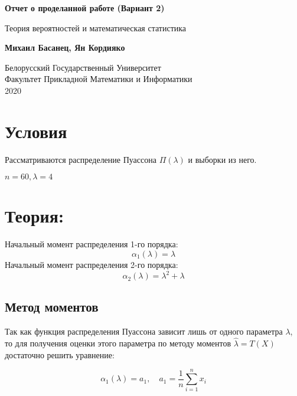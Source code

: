 \documentclass[12pt]{article}
\begin{document}
\begin{titlepage}
    \begin{center}
        \vspace*{8cm}
 
        \textbf{Отчет о проделанной работе (Вариант 2)}
 
        \vspace{0.5cm}
            Теория вероятностей и математическая статистика
             
        \vspace{1.5cm}
 
        \textbf{Михаил Басанец, Ян Кордияко}
 
        \vfill
             
             
        \vspace{0.8cm}
      
        Белорусский Государственный Университет \\
        Факультет Прикладной Математики и Информатики\\
        2020
             
    \end{center}
\end{titlepage}

\section{Условия}

Рассматриваются распределение Пуассона $\Pi(\lambda)$ 
и выборки из него.

$n = 60, \lambda = 4$ 

\section{Теория: }

Начальный момент распределения 1-го порядка:
$$ \alpha_1(\lambda) = \lambda $$
Начальный момент распределения 2-го порядка:
$$ \alpha_2(\lambda) = \lambda^2 + \lambda $$

\subsection{Метод моментов}

Так как функция распределения Пуассона зависит лишь от одного параметра $\lambda$,
то для получения оценки этого параметра по методу моментов  $\hat{\lambda} = T(X)$  достаточно решить уравнение:

$$ \alpha_1(\lambda) = a_1,\quad a_1 = \frac1n \sum_{i=1}^n{x_i} $$
\end{document}
